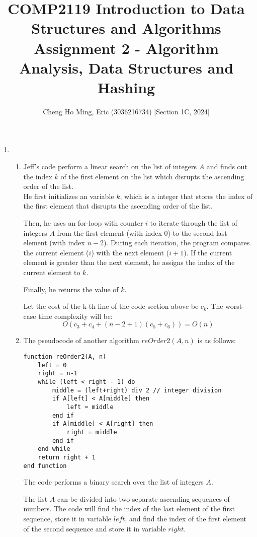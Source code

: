 \documentclass{article}
\title{COMP2119 Introduction to Data Structures and Algorithms
Assignment 2 - Algorithm Analysis, Data Structures and Hashing}
\author{Cheng Ho Ming, Eric (3036216734) [Section 1C, 2024]}
\begin{document}
\maketitle

\begin{enumerate}
\item
    \begin{enumerate}[label=(\alph*)]
        \item
        Jeff's code perform a linear search on the list of integers $A$ and finds out the index $k$ of the first element on the list which disrupts the ascending order of the list. \\
        He first initializes an variable $k$, which is a integer that stores the index of the first element that disrupts the ascending order of the list.

        Then, he uses an for-loop with counter $i$ to iterate through the list of integers $A$ from the first element (with index $0$) to the second last element (with index $n-2$). During each iteration, the program compares the current element ($i$) with the next element ($i+1$). If the current element is greater than the next element, he assigns the index of the current element to $k$.

        Finally, he returns the value of $k$.

        Let the cost of the k-th line of the code section above be $c_k$. The worst-case time complexity will be:
        \[
        O(c_3+c_4+(n-2+1)(c_5+c_6)) = O(n)
        \]

        \item The pseudocode of another algorithm $reOrder2(A,n)$ is as follows:
        \begin{verbatim}
function reOrder2(A, n)
    left = 0
    right = n-1
    while (left < right - 1) do
        middle = (left+right) div 2 // integer division
        if A[left] < A[middle] then
            left = middle
        end if
        if A[middle] < A[right] then
            right = middle
        end if
    end while
    return right + 1
end function
        \end{verbatim}
        The code performs a binary search over the list of integers $A$.

        The list $A$ can be divided into two separate ascending sequences of numbers. The code will find the index of the last element of the first sequence, store it in variable $left$, and find the index of the first element of the second sequence and store it in variable $right$.


\end{enumerate}
\end{enumerate}
\end{document}
